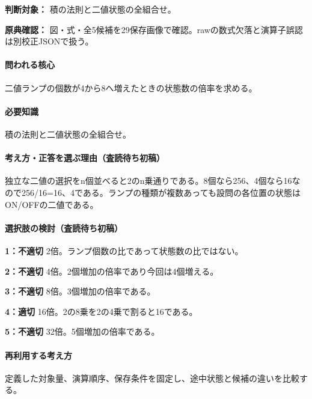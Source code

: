 \noindent\textbf{判断対象：} 積の法則と二値状態の全組合せ。\par

\noindent\textbf{原典確認：} 図・式・全5候補を29保存画像で確認。rawの数式欠落と演算子誤認は別校正JSONで扱う。\par

\paragraph{問われる核心} 二値ランプの個数が4から8へ増えたときの状態数の倍率を求める。

\paragraph{必要知識} 積の法則と二値状態の全組合せ。

\paragraph{考え方・正答を選ぶ理由（査読待ち初稿）} 独立な二値の選択をn個並べると2のn乗通りである。8個なら256、4個なら16なので256/16=\allowbreak{}16、4である。ランプの種類が複数あっても設問の各位置の状態はON/OFFの二値である。

\paragraph{選択肢の検討（査読待ち初稿）}\mbox{}\par

\noindent\textbf{1：不適切} 2倍。ランプ個数の比であって状態数の比ではない。\par

\noindent\textbf{2：不適切} 4倍。2個増加の倍率であり今回は4個増える。\par

\noindent\textbf{3：不適切} 8倍。3個増加の倍率である。\par

\noindent\textbf{4：適切} 16倍。2の8乗を2の4乗で割ると16である。\par

\noindent\textbf{5：不適切} 32倍。5個増加の倍率である。\par

\paragraph{再利用する考え方} 定義した対象量、演算順序、保存条件を固定し、途中状態と候補の違いを比較する。


